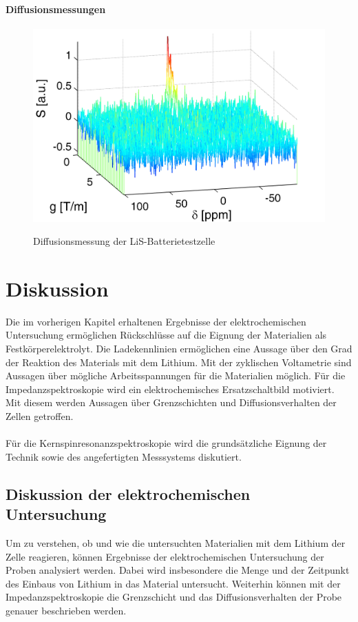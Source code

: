 \documentclass[a4paper, 11pt, headsepline,footsepline,twoside,abstract]{scrbook}
\begin{document}
\subsubsection{Diffusionsmessungen}
\begin{figure}
	\centering
	\includegraphics[width=0.95\columnwidth]{images/LiS_Diff_Batterie.jpg}
	\label{LiS_Diff_Batterie} 
	\caption{Diffusionsmessung der LiS-Batterietestzelle}
	\label{LiS_Diff}
\end{figure} 

\chapter{Diskussion}
Die im vorherigen Kapitel erhaltenen Ergebnisse der elektrochemischen Untersuchung ermöglichen Rückschlüsse auf die Eignung der Materialien als Festkörperelektrolyt. Die Ladekennlinien ermöglichen eine Aussage über den Grad der Reaktion des Materials mit dem Lithium. Mit der zyklischen Voltametrie sind Aussagen über mögliche Arbeitsspannungen für die Materialien möglich. Für die Impedanzspektroskopie wird ein elektrochemisches Ersatzschaltbild motiviert. Mit diesem werden Aussagen über Grenzschichten und Diffusionsverhalten der Zellen getroffen.
\\\\
Für die Kernspinresonanzspektroskopie wird die grundsätzliche Eignung der Technik sowie des angefertigten Messsystems diskutiert. %
\section{Diskussion der elektrochemischen Untersuchung}
Um zu verstehen, ob und wie die untersuchten Materialien mit dem Lithium der Zelle reagieren, können Ergebnisse der elektrochemischen Untersuchung der Proben analysiert werden. Dabei wird insbesondere die Menge und der Zeitpunkt des Einbaus von Lithium in das Material untersucht. Weiterhin können mit der Impedanzspektroskopie die Grenzschicht und das Diffusionsverhalten der Probe genauer beschrieben werden.
\end{document}
